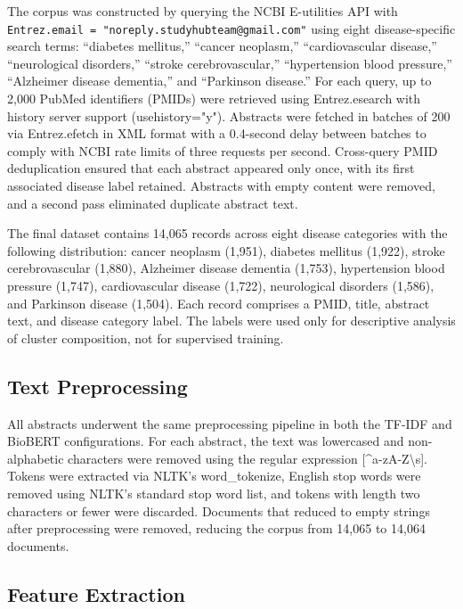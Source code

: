 \documentclass[a4paper,fleqn]{cas-dc}
\begin{document}
The corpus was constructed by querying the NCBI E-utilities API with \texttt{Entrez.email = "noreply.\allowbreak studyhubteam@\allowbreak gmail.com"} using eight disease-specific search terms: ``diabetes mellitus,'' ``cancer neoplasm,'' ``cardiovascular disease,'' ``neurological disorders,'' ``stroke cerebrovascular,'' ``hypertension blood pressure,'' ``Alzheimer disease dementia,'' and ``Parkinson disease.'' For each query, up to 2,000 PubMed identifiers (PMIDs) were retrieved using Entrez.esearch with history server support (usehistory="y"). Abstracts were fetched in batches of 200 via Entrez.efetch in XML format with a 0.4-second delay between batches to comply with NCBI rate limits of three requests per second. Cross-query PMID deduplication ensured that each abstract appeared only once, with its first associated disease label retained. Abstracts with empty content were removed, and a second pass eliminated duplicate abstract text.

The final dataset contains 14,065 records across eight disease categories with the following distribution: cancer neoplasm (1,951), diabetes mellitus (1,922), stroke cerebrovascular (1,880), Alzheimer disease dementia (1,753), hypertension blood pressure (1,747), cardiovascular disease (1,722), neurological disorders (1,586), and Parkinson disease (1,504). Each record comprises a PMID, title, abstract text, and disease category label. The labels were used only for descriptive analysis of cluster composition, not for supervised training.

\subsection{Text Preprocessing}

All abstracts underwent the same preprocessing pipeline in both the TF-IDF and BioBERT configurations. For each abstract, the text was lowercased and non-alphabetic characters were removed using the regular expression [\textasciicircum a-zA-Z\textbackslash s]. Tokens were extracted via NLTK's word\_tokenize, English stop words were removed using NLTK's standard stop word list, and tokens with length two characters or fewer were discarded. Documents that reduced to empty strings after preprocessing were removed, reducing the corpus from 14,065 to 14,064 documents.

\subsection{Feature Extraction}
\end{document}
